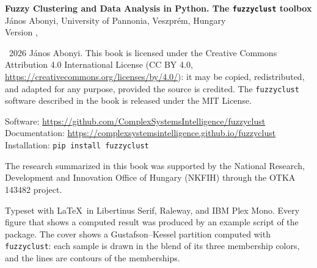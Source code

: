 {\small\raggedright
\vspace*{\fill}
\noindent\textbf{Fuzzy Clustering and Data Analysis in Python. The \texttt{fuzzyclust} toolbox}\\
J\'anos Abonyi, University of Pannonia, Veszpr\'em, Hungary\\
Version \fcversion, \fcdate

\bigskip
\noindent\textcopyright~2026 J\'anos Abonyi. This book is licensed under the Creative Commons Attribution 4.0 International License (CC BY 4.0, \url{https://creativecommons.org/licenses/by/4.0/}): it may be copied, redistributed, and adapted for any purpose, provided the source is credited. The \texttt{fuzzyclust} software described in the book is released under the MIT License.

\bigskip
\noindent Software: \url{https://github.com/ComplexSystemsIntelligence/fuzzyclust}\\
Documentation: \url{https://complexsystemsintelligence.github.io/fuzzyclust}\\
Installation: \texttt{pip install fuzzyclust}

\bigskip
\noindent The research summarized in this book was supported by the National Research, Development and Innovation Office of Hungary (NKFIH) through the OTKA 143482 project.

\bigskip
\noindent Typeset with \LaTeX\ in Libertinus Serif, Raleway, and IBM Plex Mono. Every figure that shows a computed result was produced by an example script of the package. The cover shows a Gustafson--Kessel partition computed with \texttt{fuzzyclust}: each sample is drawn in the blend of its three membership colors, and the lines are contours of the memberships.
\par}
